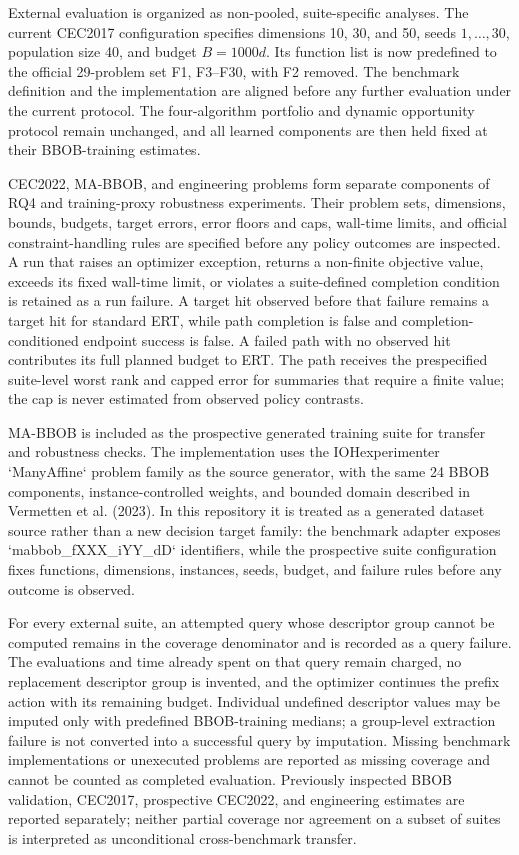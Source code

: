 External evaluation is organized as non-pooled, suite-specific analyses.  The
current CEC2017 configuration specifies dimensions 10, 30, and 50, seeds
$1,\ldots,30$, population size 40, and budget $B=1000d$.  Its function list is
now predefined to the official 29-problem set F1, F3--F30, with F2 removed.  The
benchmark definition and the implementation are aligned before any further
evaluation under the current protocol.  The four-algorithm portfolio and dynamic opportunity protocol remain
unchanged, and all learned components are then held fixed at their
BBOB-training estimates.

CEC2022, MA-BBOB, and engineering problems form separate components of RQ4 and training-proxy robustness experiments.  Their problem sets, dimensions, bounds, budgets, target errors, error floors and caps, wall-time limits, and official constraint-handling rules are specified before any policy outcomes are inspected.  A run that raises an optimizer exception, returns a non-finite objective value, exceeds its fixed wall-time limit, or violates a suite-defined completion condition is retained as a run failure.  A target hit observed before that failure remains a target hit for standard ERT, while path completion is false and completion-conditioned endpoint success is false.  A failed path with no observed hit contributes its full planned budget to ERT.  The path receives the prespecified suite-level worst rank and capped error for summaries that require a finite value; the cap is never estimated from observed policy contrasts.

MA-BBOB is included as the prospective generated training suite for transfer and robustness checks.  The implementation uses the IOHexperimenter `ManyAffine` problem family as the source generator, with the same 24 BBOB components, instance-controlled weights, and bounded domain described in Vermetten et al. (2023).  In this repository it is treated as a generated dataset source rather than a new decision target family: the benchmark adapter exposes `mabbob_fXXX_iYY_dD` identifiers, while the prospective suite configuration fixes functions, dimensions, instances, seeds, budget, and failure rules before any outcome is observed.

For every external suite, an attempted query whose descriptor group cannot be
computed remains in the coverage denominator and is recorded as a query
failure.  The evaluations and time already spent on that query remain charged,
no replacement descriptor group is invented, and the optimizer continues the
prefix action with its remaining budget.  Individual undefined descriptor
values may be imputed only with predefined BBOB-training medians; a group-level
extraction failure is not converted into a successful query by imputation.
Missing benchmark implementations or unexecuted problems are reported as
missing coverage and cannot be counted as completed evaluation.  Previously
inspected BBOB validation, CEC2017, prospective CEC2022, and engineering
estimates are reported separately;
neither partial coverage nor agreement on a subset of suites is interpreted as
unconditional cross-benchmark transfer.

